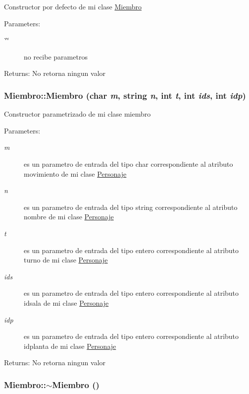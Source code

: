Constructor por defecto de mi clase \hyperlink{classMiembro}{Miembro} \begin{Desc}
\item[Parameters:]
\begin{description}
\item[{\em \char`\"{}\char`\"{}}]no recibe parametros \end{description}
\end{Desc}
\begin{Desc}
\item[Returns:]No retorna ningun valor \end{Desc}
\hypertarget{classMiembro_d90b29c63638e16aa8f83f978cb7ec47}{
\subsubsection[Miembro]{\setlength{\rightskip}{0pt plus 5cm}Miembro::Miembro (char {\em m}, \/  string {\em n}, \/  int {\em t}, \/  int {\em ids}, \/  int {\em idp})}}
\label{classMiembro_d90b29c63638e16aa8f83f978cb7ec47}


Constructor parametrizado de mi clase miembro \begin{Desc}
\item[Parameters:]
\begin{description}
\item[{\em m}]es un parametro de entrada del tipo char correspondiente al atributo movimiento de mi clase \hyperlink{classPersonaje}{Personaje} \item[{\em n}]es un parametro de entrada del tipo string correspondiente al atributo nombre de mi clase \hyperlink{classPersonaje}{Personaje} \item[{\em t}]es un parametro de entrada del tipo entero correspondiente al atributo turno de mi clase \hyperlink{classPersonaje}{Personaje} \item[{\em ids}]es un parametro de entrada del tipo entero correspondiente al atributo idsala de mi clase \hyperlink{classPersonaje}{Personaje} \item[{\em idp}]es un parametro de entrada del tipo entero correspondiente al atributo idplanta de mi clase \hyperlink{classPersonaje}{Personaje} \end{description}
\end{Desc}
\begin{Desc}
\item[Returns:]No retorna ningun valor \end{Desc}
\hypertarget{classMiembro_d8af12663ae1b9a195d05b4f700726c3}{
\subsubsection[$\sim$Miembro]{\setlength{\rightskip}{0pt plus 5cm}Miembro::$\sim$Miembro ()}}
\label{classMiembro_d8af12663ae1b9a195d05b4f700726c3}


